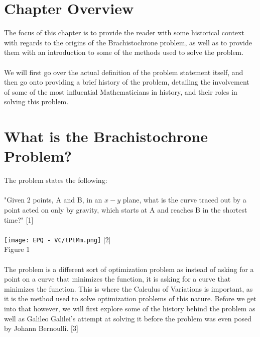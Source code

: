 \documentclass[12pt]{report}
\begin{document}
\section{Chapter Overview}
The focus of this chapter is to provide the reader with some historical context with regards to the origins of the Brachistochrone problem, as well as to provide them with an introduction to some of the methods used to solve the problem.
\\\\
We will first go over the actual definition of the problem statement itself, and then go onto providing a brief history of the problem, detailing the involvement of some of the most influential Mathematicians in history, and their roles in solving this problem.
\section{What is the Brachistochrone Problem?}
The problem states the following:
\\
\\
"Given 2 points, A and B, in an \(x-y\) plane, what is the curve traced out by a point acted on only by gravity, which starts at A and reaches B in the shortest time?" [1]
\\
\\
\texttt{[image: EPQ - VC/tPtMm.png]} [2]
\\
Figure 1
\\
\\
The problem is a different sort of optimization problem as instead of asking for a point on a curve that minimizes the function, it is asking for a curve that minimizes the function. This is where the Calculus of Variations is important, as it is the method used to solve optimization problems of this nature. Before we get into that however, we will first explore some of the history behind the problem as well as Galileo Galilei's attempt at solving it before the problem was even posed by Johann Bernoulli. [3]
\end{document}
